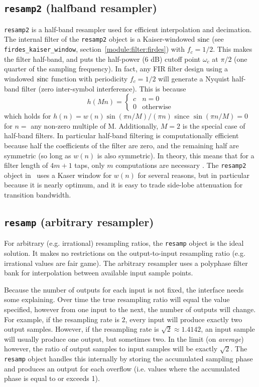 \subsection{{\tt resamp2} (halfband resampler)}
\label{module:filter:resamp2}
{\tt resamp2} is a half-band resampler used for efficient interpolation and
decimation.
The internal filter of the {\tt resamp2} object is a Kaiser-windowed $\textup{sinc}$
(see {\tt firdes\_kaiser\_window}, section~\ref{module:filter:firdes}) with
$f_c = 1/2$.
This makes the filter half-band, and puts the half-power (6 dB) cutoff point
$\omega_c$ at $\pi/2$ (one quarter of the sampling frequency).
In fact, any FIR filter design using a windowed $\textup{sinc}$ function with
periodicity $f_c=1/2$ will generate a Nyquist half-band filter (zero
inter-symbol interference).
This is because \cite[(4.6.3)]{Vaidyanathan:1993}
\[
    h(Mn) = 
        \begin{cases}
        c & n=0 \\
        0 & \text{otherwise}
        \end{cases}
\]
which holds for $h(n) = w(n) \sin(\pi n/M) / (\pi n)$ since
$\sin(\pi n/M) = 0$ for $n=$ any non-zero multiple of M.
Additionally, $M=2$ is the special case of half-band filters.
In particular half-band filtering is computationally efficient because half
the coefficients of the filter are zero, and the remaining half are symmetric
(so long as $w(n)$ is also symmetric).
In theory, this means that for a filter length of $4m+1$ taps, only $m$
computations are necessary \cite{harris:2004}.
The {\tt resamp2} object in \liquid\ uses a Kaser window for $w(n)$ for
several reasons, but in particular because it is nearly optimum, and it is
easy to trade side-lobe attenuation for transition bandwidth.

\subsection{{\tt resamp} (arbitrary resampler)}
For arbitrary (e.g. irrational) resampling ratios, the {\tt resamp} object is
the ideal solution.
It makes no restrictions on the output-to-input resampling ratio (e.g.
irrational values are fair game).
The arbitrary resampler uses a polyphase filter bank for interpolation between
available input sample points.

Because the number of outputs for each input is not fixed, the interface needs
some explaining.
Over time the true resampling ratio will equal the value specified, however
from one input to the next, the number of outputs will change.
For example, if the resampling rate is $2$, every input will produce exactly
two output samples.
However, if the resampling rate is $\sqrt{2} \approx 1.4142$, an input sample
will usually produce one output, but sometimes two.
In the limit (on {\it average}) however, the ratio of output samples to input
samples will be exactly $\sqrt{2}$.
The {\tt resamp} object handles this internally by storing the accumulated
sampling phase and produces an output for each overflow (i.e. values where the
accumulated phase is equal to or exceeds 1).

